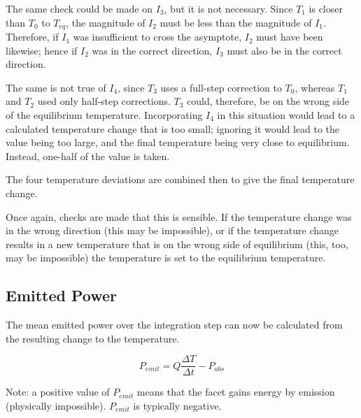 The same check could be made on $I_3$, but it is not necessary.  Since $T_1$ is closer than $T_0$ to $T_{eq}$, the magnitude of $I_2$ must be less than the magnitude of $I_1$.  Therefore, if $I_1$ was insufficient to cross the asymptote, $I_2$ must have been likewise; hence if $I_2$ was in the correct direction, $I_3$ must also be in the correct direction.

The same is not true of $I_4$, since $T_3$ uses a full-step correction to $T_0$, whereas $T_1$ and $T_2$ used only half-step corrections.  $T_3$ could, therefore, be on the wrong side of the equilibrium temperature.  Incorporating $I_4$ in this situation would lead to a calculated temperature change that is too small; ignoring it would lead to the value being too large, and the final temperature being very close to equilibrium.  Instead, one-half of the value is taken.

The four temperature deviations are combined then to give the final temperature change.

Once again, checks are made that this is sensible.  If the temperature change was in the wrong direction (this may be impossible), or if the temperature change results in a new temperature that is on the wrong side of equilibrium (this, too, may be impossible) the temperature is set to the equilibrium temperature.




\subsection{Emitted Power}
The mean emitted power over the integration step can now be calculated from the resulting change to the temperature.

\begin{equation}
P_{emit} = Q\frac{ \Delta T}{\Delta t} - P_{abs}
\end{equation}

Note: a positive value of $P_{emit}$ means that the facet gains
energy by emission (physically impossible).  $P_{emit}$ is typically negative.
